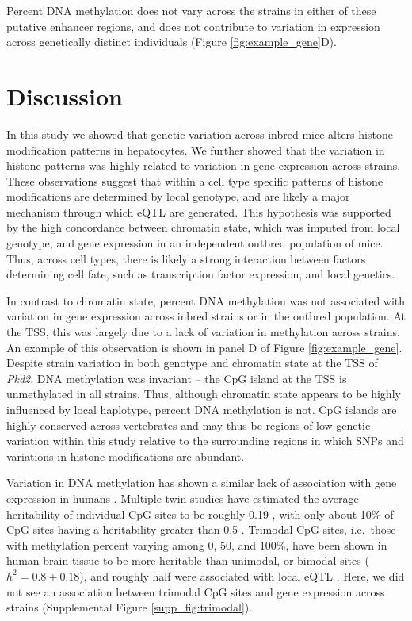 \documentclass[
  11pt,
]{article}
\begin{document}
Percent DNA methylation does not vary across the strains in either of
these putative enhancer regions, and does not contribute to variation in
expression across genetically distinct individuals (Figure
\ref{fig:example_gene}D).

\hypertarget{discussion}{%
\section{Discussion}\label{discussion}}

In this study we showed that genetic variation across inbred mice alters
histone modification patterns in hepatocytes. We further showed that the
variation in histone patterns was highly related to variation in gene
expression across strains. These observations suggest that within a cell
type specific patterns of histone modifications are determined by local
genotype, and are likely a major mechanism through which eQTL are
generated. This hypothesis was supported by the high concordance between
chromatin state, which was imputed from local genotype, and gene
expression in an independent outbred population of mice. Thus, across
cell types, there is likely a strong interaction between factors
determining cell fate, such as transcription factor expression, and
local genetics.

In contrast to chromatin state, percent DNA methylation was not
associated with variation in gene expression across inbred strains or in
the outbred population. At the TSS, this was largely due to a lack of
variation in methylation across strains. An example of this observation
is shown in panel D of Figure \ref{fig:example_gene}. Despite strain
variation in both genotype and chromatin state at the TSS of
\textit{Pkd2}, DNA methylation was invariant -- the CpG island at the
TSS is unmethylated in all strains. Thus, although chromatin state
appears to be highly influenced by local haplotype, percent DNA
methylation is not. CpG islands are highly conserved across vertebrates
\citep{papin2021cpg} and may thus be regions of low genetic variation
within this study relative to the surrounding regions in which SNPs and
variations in histone modifications are abundant.

Variation in DNA methylation has shown a similar lack of association
with gene expression in humans \citep{pmid33931130}. Multiple twin
studies have estimated the average heritability of individual CpG sites
to be roughly 0.19 \citep{pmid27051996, pmid24183450, pmid22532803},
with only about 10\% of CpG sites having a heritability greater than 0.5
\citep{pmid24183450, pmid22532803, pmid24887635}. Trimodal CpG sites,
i.e.~those with methylation percent varying among 0, 50, and 100\%, have
been shown in human brain tissue to be more heritable than unimodal, or
bimodal sites (\(h^2 = 0.8 \pm 0.18\)), and roughly half were associated
with local eQTL \citep{pmid20485568}. Here, we did not see an
association between trimodal CpG sites and gene expression across
strains (Supplemental Figure \ref{supp_fig:trimodal}).
\end{document}
